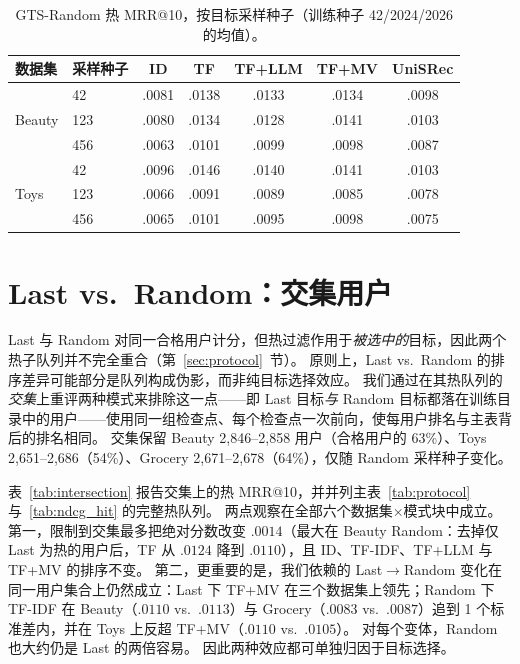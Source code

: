 \documentclass[sigconf,natbib=true,anonymous]{acmart}
\newcommand{\tfidf}{\textsc{TF-IDF}\xspace}
\newcommand{\tfllm}{\textsc{TF+LLM}\xspace}
\newcommand{\tfmv}{\textsc{TF+MV}\xspace}
\begin{document}
\begin{table}[h]
\centering
\caption{GTS-Random 热 MRR@10，按目标采样种子（训练种子 42/2024/2026 的均值）。}
\label{tab:random-seeds}
\small
\setlength{\tabcolsep}{3pt}
\begin{tabular}{@{}llccccc@{}}
\toprule
数据集 & 采样种子 & ID & TF & TF+LLM & TF+MV & UniSRec \\
\midrule
\multirow{3}{*}{Beauty}
 & 42    & .0081 & .0138 & .0133 & .0134 & .0098 \\
 & 123   & .0080 & .0134 & .0128 & .0141 & .0103 \\
 & 456   & .0063 & .0101 & .0099 & .0098 & .0087 \\
\midrule
\multirow{3}{*}{Toys}
 & 42    & .0096 & .0146 & .0140 & .0141 & .0103 \\
 & 123   & .0066 & .0091 & .0089 & .0085 & .0078 \\
 & 456   & .0065 & .0101 & .0095 & .0098 & .0075 \\
\bottomrule
\end{tabular}
\end{table}

\section{Last vs.\ Random：交集用户}
\label{app:intersection}

Last 与 Random 对同一合格用户计分，但热过滤作用于\emph{被选中的}目标，因此两个热子队列并不完全重合（第~\ref{sec:protocol}~节）。
原则上，Last vs.\ Random 的排序差异可能部分是队列构成伪影，而非纯目标选择效应。
我们通过在其热队列的\emph{交集}上重评两种模式来排除这一点——即 Last 目标\emph{与} Random 目标都落在训练目录中的用户——使用同一组检查点、每个检查点一次前向，使每用户排名与主表背后的排名相同。
交集保留 Beauty 2{,}846--2{,}858 用户（合格用户的 63\%）、Toys 2{,}651--2{,}686（54\%）、Grocery 2{,}671--2{,}678（64\%），仅随 Random 采样种子变化。

表~\ref{tab:intersection} 报告交集上的热 MRR@10，并并列主表~\ref{tab:protocol} 与~\ref{tab:ndcg_hit} 的完整热队列。
两点观察在全部六个数据集$\times$模式块中成立。
第一，限制到交集最多把绝对分数改变 $.0014$（最大在 Beauty Random：去掉仅 Last 为热的用户后，TF 从 $.0124$ 降到 $.0110$），且 ID、\tfidf、\tfllm 与 \tfmv 的排序不变。
第二，更重要的是，我们依赖的 Last$\to$Random 变化在同一用户集合上仍然成立：Last 下 \tfmv 在三个数据集上领先；Random 下 \tfidf 在 Beauty（$.0110$ vs.\ $.0113$）与 Grocery（$.0083$ vs.\ $.0087$）追到 1 个标准差内，并在 Toys 上反超 \tfmv（$.0110$ vs.\ $.0105$）。
对每个变体，Random 也大约仍是 Last 的两倍容易。
因此两种效应都可单独归因于目标选择。
\end{document}
